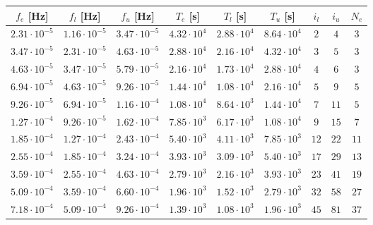 \begin{tabular}{c c c c c c c c c}
\hline
$f_e$ [Hz] & $f_l$ [Hz] & $f_u$ [Hz] & $T_e$ [s] & $T_l$ [s] & $T_u$ [s] & $i_l$ & $i_u$ & $N_e$ \\
\hline\noalign{\smallskip}
$2.31{\cdot} 10^{-5}$ & $1.16{\cdot} 10^{-5}$ & $3.47{\cdot} 10^{-5}$ & $4.32{\cdot} 10^{4}$ & $2.88{\cdot} 10^{4}$ & $8.64{\cdot} 10^{4}$ & $         2$ & $         4$ & $      3$\\
$3.47{\cdot} 10^{-5}$ & $2.31{\cdot} 10^{-5}$ & $4.63{\cdot} 10^{-5}$ & $2.88{\cdot} 10^{4}$ & $2.16{\cdot} 10^{4}$ & $4.32{\cdot} 10^{4}$ & $         3$ & $         5$ & $      3$\\
$4.63{\cdot} 10^{-5}$ & $3.47{\cdot} 10^{-5}$ & $5.79{\cdot} 10^{-5}$ & $2.16{\cdot} 10^{4}$ & $1.73{\cdot} 10^{4}$ & $2.88{\cdot} 10^{4}$ & $         4$ & $         6$ & $      3$\\
$6.94{\cdot} 10^{-5}$ & $4.63{\cdot} 10^{-5}$ & $9.26{\cdot} 10^{-5}$ & $1.44{\cdot} 10^{4}$ & $1.08{\cdot} 10^{4}$ & $2.16{\cdot} 10^{4}$ & $         5$ & $         9$ & $      5$\\
$9.26{\cdot} 10^{-5}$ & $6.94{\cdot} 10^{-5}$ & $1.16{\cdot} 10^{-4}$ & $1.08{\cdot} 10^{4}$ & $8.64{\cdot} 10^{3}$ & $1.44{\cdot} 10^{4}$ & $         7$ & $        11$ & $      5$\\
$1.27{\cdot} 10^{-4}$ & $9.26{\cdot} 10^{-5}$ & $1.62{\cdot} 10^{-4}$ & $7.85{\cdot} 10^{3}$ & $6.17{\cdot} 10^{3}$ & $1.08{\cdot} 10^{4}$ & $         9$ & $        15$ & $      7$\\
$1.85{\cdot} 10^{-4}$ & $1.27{\cdot} 10^{-4}$ & $2.43{\cdot} 10^{-4}$ & $5.40{\cdot} 10^{3}$ & $4.11{\cdot} 10^{3}$ & $7.85{\cdot} 10^{3}$ & $        12$ & $        22$ & $     11$\\
$2.55{\cdot} 10^{-4}$ & $1.85{\cdot} 10^{-4}$ & $3.24{\cdot} 10^{-4}$ & $3.93{\cdot} 10^{3}$ & $3.09{\cdot} 10^{3}$ & $5.40{\cdot} 10^{3}$ & $        17$ & $        29$ & $     13$\\
$3.59{\cdot} 10^{-4}$ & $2.55{\cdot} 10^{-4}$ & $4.63{\cdot} 10^{-4}$ & $2.79{\cdot} 10^{3}$ & $2.16{\cdot} 10^{3}$ & $3.93{\cdot} 10^{3}$ & $        23$ & $        41$ & $     19$\\
$5.09{\cdot} 10^{-4}$ & $3.59{\cdot} 10^{-4}$ & $6.60{\cdot} 10^{-4}$ & $1.96{\cdot} 10^{3}$ & $1.52{\cdot} 10^{3}$ & $2.79{\cdot} 10^{3}$ & $        32$ & $        58$ & $     27$\\
$7.18{\cdot} 10^{-4}$ & $5.09{\cdot} 10^{-4}$ & $9.26{\cdot} 10^{-4}$ & $1.39{\cdot} 10^{3}$ & $1.08{\cdot} 10^{3}$ & $1.96{\cdot} 10^{3}$ & $        45$ & $        81$ & $     37$\\

\end{tabular}
